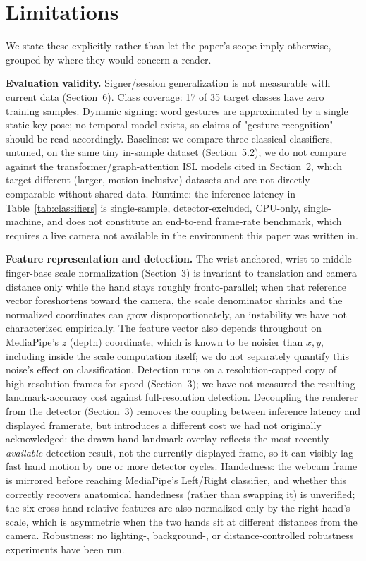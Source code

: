 \documentclass[runningheads]{llncs}
\begin{document}
\section{Limitations}

We state these explicitly rather than let the paper's scope imply
otherwise, grouped by where they would concern a reader.

\textbf{Evaluation validity.} Signer/session generalization is not
measurable with current data (Section~6). Class coverage: 17 of 35 target
classes have zero training samples. Dynamic signing: word gestures are
approximated by a single static key-pose; no temporal model exists, so
claims of "gesture recognition" should be read accordingly. Baselines: we
compare three classical classifiers, untuned, on the same tiny in-sample
dataset (Section~5.2); we do not compare against the
transformer/graph-attention ISL models cited in Section~2, which target
different (larger, motion-inclusive) datasets and are not directly
comparable without shared data. Runtime: the inference latency in
Table~\ref{tab:classifiers} is single-sample, detector-excluded,
CPU-only, single-machine, and does not constitute an end-to-end
frame-rate benchmark, which requires a live camera not available in the
environment this paper was written in.

\textbf{Feature representation and detection.} The wrist-anchored,
wrist-to-middle-finger-base scale normalization (Section~3) is invariant
to translation and camera distance only while the hand stays roughly
fronto-parallel; when that reference vector foreshortens toward the
camera, the scale denominator shrinks and the normalized coordinates can
grow disproportionately, an instability we have not characterized
empirically. The feature vector also depends throughout on MediaPipe's
$z$ (depth) coordinate, which is known to be noisier than $x,y$, including
inside the scale computation itself; we do not separately quantify this
noise's effect on classification. Detection runs on a resolution-capped
copy of high-resolution frames for speed (Section~3); we have not
measured the resulting landmark-accuracy cost against full-resolution
detection. Decoupling the renderer from the detector (Section~3) removes
the coupling between inference latency and displayed framerate, but
introduces a different cost we had not originally acknowledged: the
drawn hand-landmark overlay reflects the most recently \emph{available}
detection result, not the currently displayed frame, so it can visibly
lag fast hand motion by one or more detector cycles. Handedness: the
webcam frame is mirrored before reaching MediaPipe's Left/Right
classifier, and whether this correctly recovers anatomical handedness
(rather than swapping it) is unverified; the six cross-hand relative
features are also normalized only by the right hand's scale, which is
asymmetric when the two hands sit at different distances from the
camera. Robustness: no lighting-, background-, or distance-controlled
robustness experiments have been run.
\end{document}
